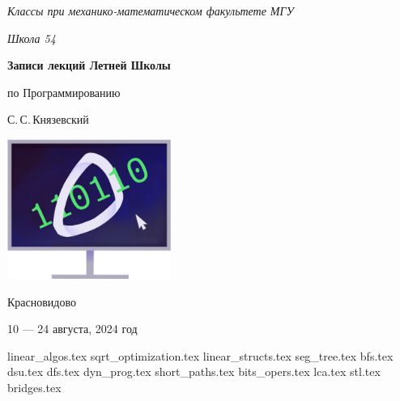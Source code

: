 \documentclass[a5paper, 10pt, twoside]{article}
\begin{document}
\begin{titlepage}
    \centering
    \vspace*{\fill}
    
    {\sl\large Классы при механико-математическом факультете МГУ} \medskip

    {\sl\large Школа 54}

    \vspace*{4cm}

    \begin{spacing}{1}
        \LARGE\bfseries Записи лекций Летней Школы\par по Программированию
    \end{spacing}
    \smallskip
    
    {\Large С.\,С.\,Князевский}
    \vspace{.6cm}
    
    \includegraphics[width=0.4\textwidth]{img/logo.jpg}

    \vspace*{4cm}

    {\large Красновидово}\medskip
    
    {\large 10 --- 24 августа, 2024 год}
    \vspace*{\fill}
\end{titlepage}

\tableofcontents
\newpage

{linear_algos.tex}
{sqrt_optimization.tex}
{linear_structs.tex}
{seg_tree.tex}
{bfs.tex}
{dsu.tex}
{dfs.tex}
{dyn_prog.tex}
{short_paths.tex}
{bits_opers.tex}
{lca.tex}
{stl.tex}
{bridges.tex}
\end{document}
